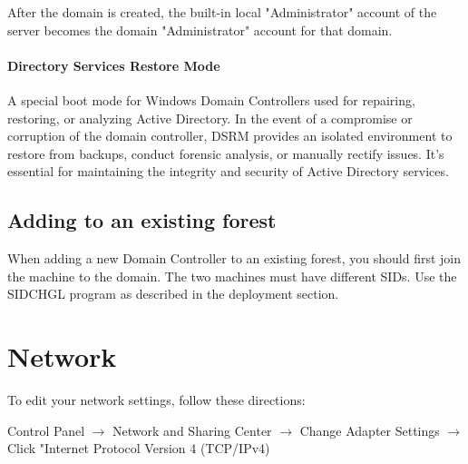 \documentclass{article}
\begin{document}
After the domain is created, the built-in local "Administrator" 
account of the server becomes the domain "Administrator" 
account for that domain.

\paragraph{Directory Services Restore Mode}
A special boot mode for Windows Domain Controllers used for repairing, 
restoring, or analyzing Active Directory. In the event of a compromise 
or corruption of the domain controller, DSRM provides an isolated 
environment to restore from backups, conduct forensic analysis, or 
manually rectify issues. It's essential for maintaining the integrity 
and security of Active Directory services.

\subsection{Adding to an existing forest}
When adding a new Domain Controller to an existing forest, you should first join the machine to the domain.
The two machines must have different SIDs. Use the SIDCHGL program as described in the deployment section. 

\section{Network}
To edit your network settings, follow these directions:

Control Panel $\rightarrow$ Network and Sharing Center $\rightarrow$
Change Adapter Settings $\rightarrow$ Click "Internet Protocol Version 4 (TCP/IPv4)
\end{document}

